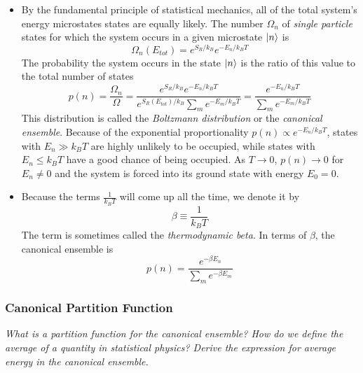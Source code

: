 \documentclass[11pt, a4paper]{article}
\begin{document}
\begin{itemize}
	\item By the fundamental principle of statistical mechanics, all of the total system's energy microstates states are equally likely. The number $ \Omega_{n} $ of \textit{single particle} states for which the system occurs in a given microstate $ \ket{n} $ is
	\begin{equation*}
		\Omega_{n}(E_{tot}) = e^{S_{R}/k_{B}} e^{-E_{n}/k_{B}T}
	\end{equation*}
	The probability the system occurs in the state $ \ket{n} $ is the ratio of this value to the total number of states
	\begin{equation*}
		p(n) = \frac{\Omega_{n}}{\Omega} = \frac{e^{S_{R}/k_{B}} e^{-E_{n}/k_{B}T}}{e^{S_{R}(E_{tot})/k_{B}} \sum_{m} e^{-E_{m}/k_{B}T}} = \frac{ e^{-E_{n}/k_{B}T}}{\sum_{m} e^{-E_{m}/k_{B}T}}
	\end{equation*}
	This distribution is called the \textit{Boltzmann distribution} or the \textit{canonical ensemble}. Because of the exponential proportionality $ p(n) \propto  e^{-E_{n}/k_{B}T} $, states with $ E_{n} \gg k_{B}T $ are highly unlikely to be occupied, while states with $ E_{n} \leq k_{B}T $ have a good chance of being occupied. As $ T \to 0 $, $ p(n) \to 0 $ for $ E_{n} \neq 0 $ and the system is forced into its ground state with energy $ E_{0} = 0$.
	
	\item Because the terms $ \frac{1}{k_{B}T} $ will come up all the time, we denote it by
	\begin{equation*}
		\beta \equiv \frac{1}{k_{B}T}
	\end{equation*}
	The term is sometimes called the \textit{thermodynamic beta}. In terms of $ \beta $, the canonical ensemble is
	\begin{equation*}
		p(n) =  \frac{ e^{-\beta E_{n}}}{\sum_{m} e^{-\beta E_{m}}}
	\end{equation*}
	
	
\end{itemize}


\subsubsection{Canonical Partition Function}
\textit{What is a partition function for the canonical ensemble? How do we define the average of a quantity in statistical physics? Derive the expression for average energy in the canonical ensemble.}
\end{document}
